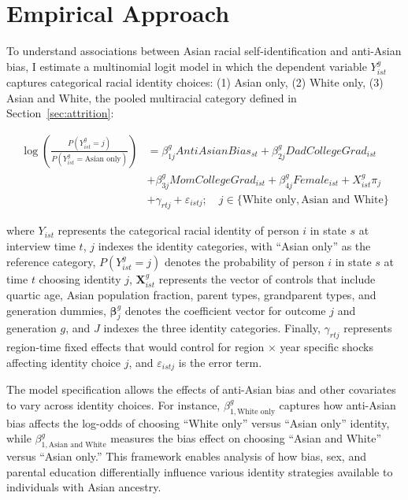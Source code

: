 \section{Empirical Approach}\label{sec:empstrat}

To understand associations between Asian racial self-identification and anti-Asian bias, I estimate a multinomial logit model in which the dependent variable $Y_{ist}^g$ captures categorical racial identity choices: (1) Asian only, (2) White only, (3) Asian and White, the pooled multiracial category defined in Section~\ref{sec:attrition}:

\begin{align}
\log\left(\frac{P(Y_{ist}^g = j)}{P(Y_{ist}^g = \text{Asian only})}\right) &= \beta_{1j}^g AntiAsianBias_{st} + \beta_{2j}^g DadCollegeGrad_{ist}\nonumber \\ 
& + \beta_{3j}^g MomCollegeGrad_{ist} + \beta_{4j}^g Female_{ist} + X_{ist}^g\pi_j  \nonumber \\ 
& + \gamma_{rtj} + \varepsilon_{istj}; \quad j \in \{\text{White only}, \text{Asian and White}\} \label{eq:multinomial_logit}
\end{align}

where $Y_{ist}$ represents the categorical racial identity of person $i$ in state $s$ at interview time $t$, $j$ indexes the identity categories, with ``Asian only'' as the reference category, $P(Y_{ist}^g = j)$ denotes the probability of person $i$ in state $s$ at time $t$ choosing identity $j$, $\mathbf{X}_{ist}^g$ represents the vector of controls that include quartic age, Asian population fraction, parent types, grandparent types, and generation dummies, $\boldsymbol{\beta}_j^g$ denotes the coefficient vector for outcome $j$ and generation $g$, and $J$ indexes the three identity categories. Finally, $\gamma_{rtj}$ represents region-time fixed effects that would control for region $\times$ year specific shocks affecting identity choice $j$, and $\varepsilon_{istj}$ is the error term.

The model specification allows the effects of anti-Asian bias and other covariates to vary across identity choices. For instance, $\beta_{1,\text{White only}}^g$ captures how anti-Asian bias affects the log-odds of choosing ``White only'' versus ``Asian only'' identity, while $\beta_{1,\text{Asian and White}}^g$ measures the bias effect on choosing ``Asian and White'' versus ``Asian only.'' This framework enables analysis of how bias, sex, and parental education differentially influence various identity strategies available to individuals with Asian ancestry.

